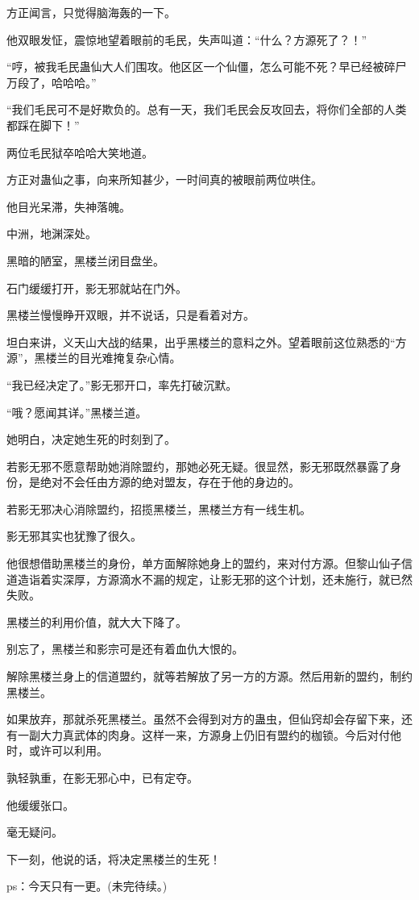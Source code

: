 \begin{this_body}
方正闻言，只觉得脑海轰的一下。

他双眼发怔，震惊地望着眼前的毛民，失声叫道：“什么？方源死了？！”

“哼，被我毛民蛊仙大人们围攻。他区区一个仙僵，怎么可能不死？早已经被碎尸万段了，哈哈哈。”

“我们毛民可不是好欺负的。总有一天，我们毛民会反攻回去，将你们全部的人类都踩在脚下！”

两位毛民狱卒哈哈大笑地道。

方正对蛊仙之事，向来所知甚少，一时间真的被眼前两位哄住。

他目光呆滞，失神落魄。

中洲，地渊深处。

黑暗的陋室，黑楼兰闭目盘坐。

石门缓缓打开，影无邪就站在门外。

黑楼兰慢慢睁开双眼，并不说话，只是看着对方。

坦白来讲，义天山大战的结果，出乎黑楼兰的意料之外。望着眼前这位熟悉的“方源”，黑楼兰的目光难掩复杂心情。

“我已经决定了。”影无邪开口，率先打破沉默。

“哦？愿闻其详。”黑楼兰道。

她明白，决定她生死的时刻到了。

若影无邪不愿意帮助她消除盟约，那她必死无疑。很显然，影无邪既然暴露了身份，是绝对不会任由方源的绝对盟友，存在于他的身边的。

若影无邪决心消除盟约，招揽黑楼兰，黑楼兰方有一线生机。

影无邪其实也犹豫了很久。

他很想借助黑楼兰的身份，单方面解除她身上的盟约，来对付方源。但黎山仙子信道造诣着实深厚，方源滴水不漏的规定，让影无邪的这个计划，还未施行，就已然失败。

黑楼兰的利用价值，就大大下降了。

别忘了，黑楼兰和影宗可是还有着血仇大恨的。

解除黑楼兰身上的信道盟约，就等若解放了另一方的方源。然后用新的盟约，制约黑楼兰。

如果放弃，那就杀死黑楼兰。虽然不会得到对方的蛊虫，但仙窍却会存留下来，还有一副大力真武体的肉身。这样一来，方源身上仍旧有盟约的枷锁。今后对付他时，或许可以利用。

孰轻孰重，在影无邪心中，已有定夺。

他缓缓张口。

毫无疑问。

下一刻，他说的话，将决定黑楼兰的生死！

ps：今天只有一更。(未完待续。)

\end{this_body}

